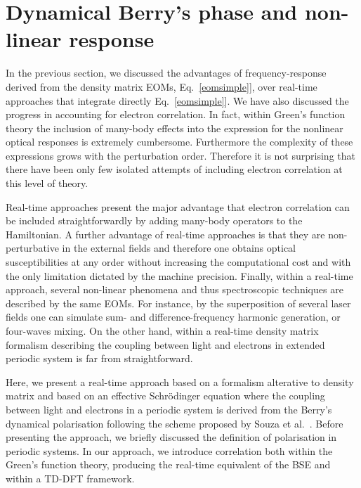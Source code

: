 \section{Dynamical Berry's phase and non-linear response} 
\label{chapterberry}
In the previous section, we discussed the advantages of frequency-response derived from the  density matrix EOMs, Eq.~\ref{eomsimple}], over real-time approaches that integrate directly Eq.~\ref{eomsimple}].
    We have also discussed the progress in accounting for electron correlation. In fact, within Green's function theory the inclusion of many-body effects into the expression for the nonlinear optical responses is extremely cumbersome. Furthermore the complexity of these expressions grows with the perturbation order. Therefore it is not surprising that there have been only few isolated attempts of including electron correlation at this level of theory.

    Real-time approaches present the major advantage that electron correlation can be included straightforwardly by adding many-body operators to the Hamiltonian. A further advantage of real-time approaches is that they are non-perturbative in the external fields and therefore one obtains optical susceptibilities at any order without increasing the computational cost and with the only limitation dictated by the machine precision. Finally, within a real-time approach, several non-linear phenomena and thus spectroscopic techniques are described by the same EOMs. For instance, by the superposition of several laser fields one can simulate sum- and difference-frequency harmonic generation, or four-waves mixing.\cite{boyd} On the other hand, within a real-time density matrix formalism describing the coupling between light and electrons in extended  periodic system is far from straightforward.

    Here, we present a real-time \ai approach based on a formalism alterative to density matrix and based on an effective Schr\"odinger equation where the coupling between light and electrons in a periodic system is derived from the Berry's dynamical polarisation following the scheme proposed by Souza et al.~\cite{souza_prb}. Before presenting the approach, we briefly discussed the  definition of polarisation in periodic systems. In our approach, we introduce correlation both within the Green's function theory, producing the real-time equivalent of the BSE and within a TD-DFT framework.  
    
